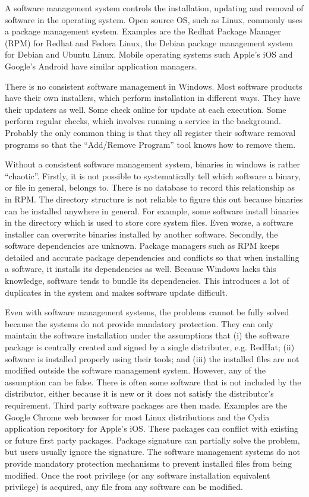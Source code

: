 A software management system controls the installation, updating and
removal of software in the operating system.
Open source OS, such as Linux, commonly uses a package management system.
Examples are the Redhat Package Manager (RPM) for Redhat and Fedora Linux,
the Debian package management system for Debian and Ubuntu Linux.
Mobile operating systems such Apple's iOS and Google's Android have
similar application managers.

There is no consistent software management in Windows.
Most software products have their own installers, which perform installation in
different ways.
They have their updaters as well.
Some check online for update at each execution.
Some perform regular checks, which involves running
a service in the background.
Probably the only common thing is that they all register their software
removal programs so that the ``Add/Remove Program'' tool knows
how to remove them.

Without a consistent software management system, binaries in windows
is rather ``chaotic''.
Firstly, it is not possible to systematically tell which software a binary,
or file in general, belongs to.
There is no database to record this relationship as in RPM.
The directory structure is not reliable to figure this out because
binaries can be installed anywhere in general.
For example, some software install binaries in the 
directory which is used to store core system files.
Even worse, a software installer can overwrite binaries installed by another
software.
Secondly, the software dependencies are unknown.
Package managers such as RPM keeps detailed and accurate
package dependencies and conflicts
so that when installing a software, it installs its dependencies as well.
Because Windows lacks this knowledge, software tends to bundle its dependencies.
This introduces a lot of duplicates in the system and makes software
update difficult.

Even with software management systems, the problems cannot be fully solved
because the systems do not provide mandatory protection.
They can only maintain the software installation under the assumptions that
(i) the software package is centrally created and signed by
a single distributer, e.g. RedHat;
(ii) software is installed properly using their tools; and
(iii) the installed files are not modified outside the
software management system.
However, any of the assumption can be false.
There is often some software that is not included by the distributor,
either because it is new or it does not satisfy the distributor's
requirement.
Third party software packages are then made.
Examples are the Google Chrome web browser for most Linux distributions
and the Cydia application repository for Apple's iOS.
These packages can conflict with existing or future first party packages.
Package signature can partially solve the problem, but users usually
ignore the signature.
The software management systems do not provide mandatory protection
mechanisms to prevent installed files from being modified.
Once the root privilege (or any software installation equivalent privilege)
is acquired, any file from any software can be modified.

